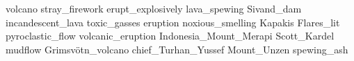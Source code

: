 volcano stray\_firework erupt\_explosively lava\_spewing Sivand\_dam incandescent\_lava toxic\_gasses eruption noxious\_smelling Kapakis Flares\_lit pyroclastic\_flow volcanic\_eruption Indonesia\_Mount\_Merapi Scott\_Kardel mudflow Grimsvötn\_volcano chief\_Turhan\_Yussef Mount\_Unzen spewing\_ash 
